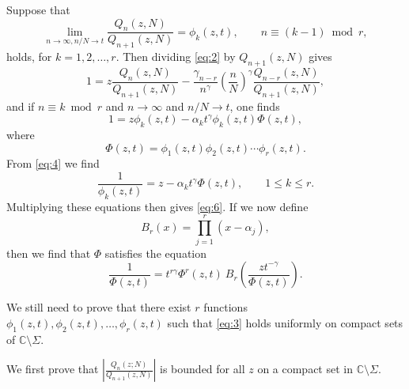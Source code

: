 \documentclass[12pt]{article}
\numberwithin{equation}{section}
\begin{document}
Suppose that \begin{equation}   \label{eq:3}
     \lim_{n \to \infty, n/N \to t}  \frac{Q_n(z,N)}{Q_{n+1}(z,N)} = \phi_k(z,t), \qquad n \equiv ( k-1) \bmod r,
\end{equation} holds, for \(k=1,2,\ldots,r\). Then dividing \eqref{eq:2} by $Q_{n+1}(z,N)$ gives
\begin{equation}\label{rec rel2}
 1 = z \frac{Q_n(z,N)}{Q_{n+1}(z,N)} - \frac{\gamma_{n-r}}{n^\gamma} \left(\frac{n}{N}\right)^\gamma \frac{Q_{n-r}(z,N)}{Q_{n+1}(z,N)}, 
\end{equation}
and if $n \equiv k\bmod r$ and $n \to \infty$ and $n/N \to t$, one finds
\begin{equation}  \label{eq:4}
     1 = z \phi_k(z,t) - \alpha_k t^\gamma \phi_k(z,t) \Phi(z,t),
\end{equation}
where
\[      \Phi(z,t) = \phi_1(z,t)\phi_2(z,t)\cdots \phi_{r}(z,t).   \]
From \eqref{eq:4} we find
\begin{equation}  \label{eq:5}
    \frac{1}{\phi_k(z,t)} = z - \alpha_k t^\gamma \Phi(z,t), \qquad 1 \leq k \leq r. 
\end{equation}
Multiplying these equations then gives \eqref{eq:6}. 
If we now define
\[   B_r(x) = \prod_{j=1}^{r} (x-\alpha_j), \]
then we find that $\Phi$ satisfies the equation
\begin{equation}   \label{eq:7}
   \frac{1}{\Phi(z,t)} = t^{r\gamma} \Phi^r(z,t)\  B_r\left(\frac{zt^{-\gamma}}{\Phi(z,t)} \right) .
\end{equation}


We still need to prove that there exist $r$ functions $\phi_1(z,t),\phi_2(z,t),\ldots,\phi_r(z,t)$ such that \eqref{eq:3} holds uniformly on compact sets of $\mathbb{C} \setminus \Sigma$. 


We first prove that $ \left| \frac{Q_n(z;N)}{Q_{n+1}(z,N)} \right|$ is bounded for all $z$ on a compact set in $\mathbb{C} \setminus \Sigma$. 
\end{document}
